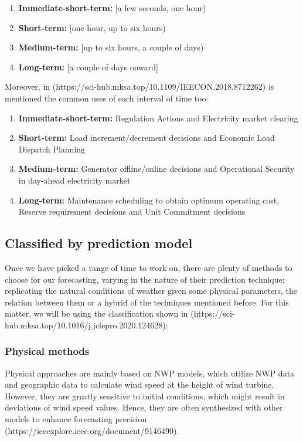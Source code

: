 \begin{enumerate}
    \item \textbf{Immediate-short-term:}  [a few seconds, one hour)
    \item \textbf{Short-term:} [one hour, up to six hours)
    \item \textbf{Medium-term:} [up to six hours, a couple of days)
    \item \textbf{Long-term:} [a couple of days onward]
\end{enumerate}

Moreover, in (https://sci-hub.mksa.top/10.1109/IEECON.2018.8712262) is mentioned the common uses of each interval of time too:

\begin{enumerate}
    \item \textbf{Immediate-short-term:}  Regulation Actions and Electricity market clearing
    \item \textbf{Short-term:} Load increment/decrement decisions and Economic Load Dispatch Planning
    \item \textbf{Medium-term:} Generator offline/online decisions and Operational Security in day-ahead electricity market
    \item \textbf{Long-term:} Maintenance scheduling to obtain optimum operating cost, Reserve requirement decisions and Unit Commitment decisions
\end{enumerate}

\subsection{Classified by prediction model}

Once we have picked a range of time to work on, there are plenty of methods to choose for our forecasting, varying in the nature of their prediction technique: replicating the natural conditions of weather given some physical parameters, the relation between them or a hybrid of the techniques mentioned before. For this matter, we will be using the classification shown in (https://sci-hub.mksa.top/10.1016/j.jclepro.2020.124628):

\subsubsection{Physical methods}
Physical approaches are mainly based on NWP models, which utilize NWP data and geographic data to calculate wind speed at the height of wind turbine. However, they are greatly sensitive to initial conditions, which might result in deviations of wind speed values. Hence, they are often synthesized with other models to enhance forecasting precision (https://ieeexplore.ieee.org/document/9146490).

